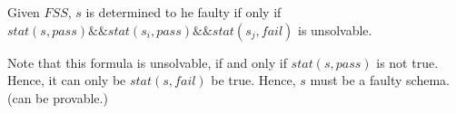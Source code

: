 %
%

\begin{proposition}\label{pro:determinableparthealthy}
Given $FSS$, $s$ is determined to he faulty if only if $stat(s, pass) \&\& stat(s_{i}, pass) \&\& stat(s_{j}, fail)$ is unsolvable.
\end{proposition}

Note that this formula is unsolvable, if and only if $stat(s, pass)$ is not true. Hence, it can only be $stat(s, fail)$ be true. Hence, $s$ must be a faulty schema.  (can be provable.)


